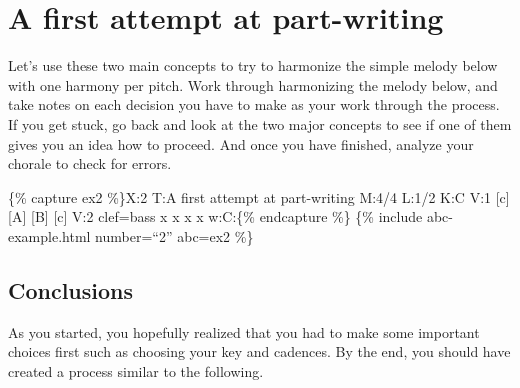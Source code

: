 \documentclass{book}
\begin{document}
\hypertarget{a-first-attempt-at-part-writing}{%
\section{A first attempt at
part-writing}\label{a-first-attempt-at-part-writing}}

Let's use these two main concepts to try to harmonize the simple melody below
with one harmony per pitch. Work through harmonizing the melody below, and
take notes on each decision you have to make as your work through the process.
If you get stuck, go back and look at the two major concepts to see if one of
them gives you an idea how to proceed. And once you have finished, analyze
your chorale to check for errors.

\{\% capture ex2 \%\}X:2 T:A first attempt at part-writing M:4/4 L:1/2 K:C V:1
{[}c{]} {[}A{]}\textbar{} {[}B{]} {[}c{]}\textbar{]} V:2 clef=bass x
x\textbar{} x x\textbar{]} w:C:\{\% endcapture \%\} \{\% include
abc-example.html number=``2'' abc=ex2 \%\}

\hypertarget{conclusions-14}{%
\subsection{Conclusions}\label{conclusions-14}}

As you started, you hopefully realized that you had to make some important
choices first such as choosing your key and cadences. By the end, you should
have created a process similar to the following.
\end{document}

